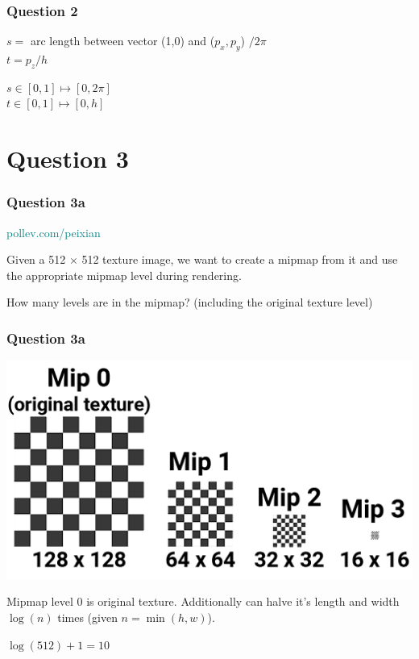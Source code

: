\documentclass{beamer}
\begin{document}
\begin{frame}
    \frametitle{Question 2}

    \begin{tcolorbox}
        $s = $ arc length between vector (1,0) and ($p_x, p_y$) $/ 2\pi$ \\
        $t = p_z / h$
    \end{tcolorbox}

    $s \in [0, 1] \mapsto [0, 2\pi]$\\
    $t \in [0, 1] \mapsto [0, h]$\\

\end{frame}

\section{Question 3}

\begin{frame}
    \frametitle{Question 3a}

    \begin{tcolorbox}[colback=teal!5!white]
        \textcolor{teal}{pollev.com/peixian}
    \end{tcolorbox}

    Given a 512 $\times$ 512 texture image, we want to create a mipmap from it and use the appropriate mipmap level 
    during rendering. 

    \vspace{1em}

    How many levels are in the mipmap? (including the original texture level)
\end{frame}

\begin{frame}
    \frametitle{Question 3a}

    \begin{center}
        \includegraphics[scale=0.45]{mipmap-levels.png}
    \end{center}

    Mipmap level 0 is original texture. Additionally can halve it's length and width $\log(n)$ times
    (given $n = \min(h,w)$).

    \begin{tcolorbox}
        \centering
        $\log(512) + 1 = 10$
    \end{tcolorbox}

\end{frame}
\end{document}
